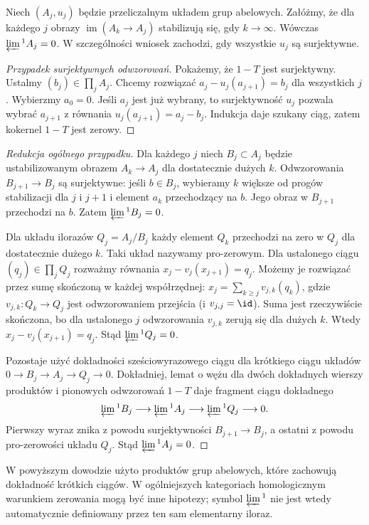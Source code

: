 \begin{twierdzenie}
\label{thm:xviii-ml}
Niech $(A_j,u_j)$ będzie przeliczalnym układem grup abelowych.
Załóżmy, że dla każdego $j$ obrazy
$\operatorname{im}(A_k\to A_j)$ stabilizują się, gdy $k\to\infty$.
Wówczas $\varprojlim{}^1 A_j=0$.
W szczególności wniosek zachodzi, gdy wszystkie $u_j$ są surjektywne.
\end{twierdzenie}
\begin{proof}[Przypadek surjektywnych odwzorowań]
Pokażemy, że $1-T$ jest surjektywny. Ustalmy
$(b_j)\in\prod_jA_j$. Chcemy rozwiązać
$a_j-u_j(a_{j+1})=b_j$ dla wszystkich $j$.
Wybierzmy $a_0=0$. Jeśli $a_j$ jest już wybrany, to
surjektywność $u_j$ pozwala wybrać $a_{j+1}$ z równania
$u_j(a_{j+1})=a_j-b_j$. Indukcja daje szukany ciąg,
zatem kokernel $1-T$ jest zerowy.
\end{proof}
\begin{proof}[Redukcja ogólnego przypadku]
Dla każdego $j$ niech $B_j\subset A_j$ będzie ustabilizowanym
obrazem $A_k\to A_j$ dla dostatecznie dużych $k$.
Odwzorowania $B_{j+1}\to B_j$ są surjektywne: jeśli
$b\in B_j$, wybieramy $k$ większe od progów stabilizacji dla
$j$ i $j+1$ i element $a_k$ przechodzący na $b$. Jego obraz
w $B_{j+1}$ przechodzi na $b$. Zatem $\varprojlim{}^1 B_j=0$.

Dla układu ilorazów $Q_j=A_j/B_j$ każdy element $Q_k$
przechodzi na zero w $Q_j$ dla dostatecznie dużego $k$.
Taki układ nazywamy pro-zerowym. Dla ustalonego ciągu
$(q_j)\in\prod_j Q_j$ rozważmy równania
$x_j-v_j(x_{j+1})=q_j$. Możemy je rozwiązać przez sumę
skończoną w każdej współrzędnej:
$x_j=\sum_{k\ge j}v_{j,k}(q_k)$, gdzie
$v_{j,k}:Q_k\to Q_j$ jest odwzorowaniem przejścia
(i $v_{j,j}=\id$). Suma jest rzeczywiście skończona,
bo dla ustalonego $j$ odwzorowania $v_{j,k}$ zerują się dla dużych $k$.
Wtedy $x_j-v_j(x_{j+1})=q_j$. Stąd $\varprojlim{}^1Q_j=0$.

Pozostaje użyć dokładności sześciowyrazowego ciągu dla
krótkiego ciągu układów $0\to B_j\to A_j\to Q_j\to0$.
Dokładniej, lemat o wężu dla dwóch dokładnych
wierszy produktów i pionowych odwzorowań $1-T$
daje fragment ciągu dokładnego
\[
\varprojlim{}^1 B_j\longrightarrow
\varprojlim{}^1 A_j\longrightarrow
\varprojlim{}^1 Q_j\longrightarrow0.
\]
Pierwszy wyraz znika z powodu surjektywności
$B_{j+1}\to B_j$, a ostatni z powodu pro-zerowości
układu $Q_j$. Stąd $\varprojlim{}^1A_j=0$.
\end{proof}
\begin{uwaga}
W powyższym dowodzie użyto produktów grup abelowych,
które zachowują dokładność krótkich ciągów. W ogólniejszych
kategoriach homologicznym warunkiem zerowania mogą być inne
hipotezy; symbol $\varprojlim{}^1$ nie jest wtedy automatycznie
definiowany przez ten sam elementarny iloraz.
\end{uwaga}

